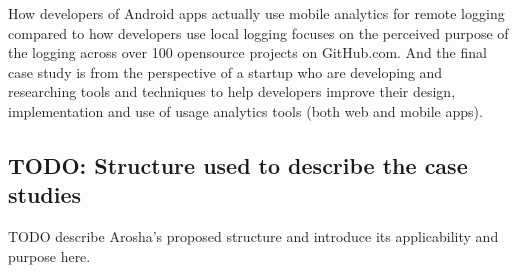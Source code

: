 How developers of Android apps actually use mobile analytics for remote logging compared to how developers use local logging focuses on the perceived purpose of the logging across over 100 opensource projects on GitHub.com. And the final case study is from the perspective of a startup who are developing and researching tools and techniques to help developers improve their design, implementation and use of usage analytics tools (both web and mobile apps). 

\subsection{TODO: Structure used to describe the case studies}
TODO describe Arosha's proposed structure and introduce its applicability and purpose here.

\clearpage





\clearpage


\clearpage


\clearpage


\clearpage


\clearpage



\clearpage



\clearpage


\clearpage